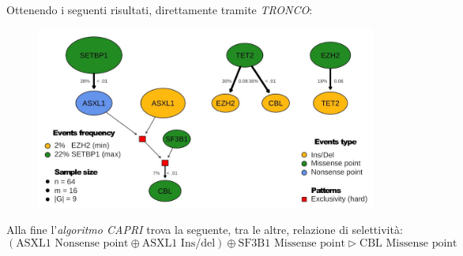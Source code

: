 \documentclass[a4paper,12pt, oneside]{book}
\begin{document}
Ottenendo i seguenti risultati, direttamente tramite \textit{TRONCO}:
\begin{figure}[H]
  \centering
  \includegraphics[scale = 0.22]{img/acml2.jpg}
\end{figure}
Alla fine l'\textit{algoritmo CAPRI} trova la seguente, tra le altre, relazione
di selettività:
{\footnotesize{\[(\mbox{ASXL1 Nonsense point} \oplus \mbox{ASXL1 Ins/del})
      \oplus \mbox{SF3B1 Missense point} \triangleright \mbox{CBL Missense
        point}\]}} 
\end{document}
